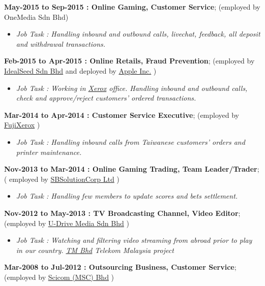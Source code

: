 \documentclass[]{article}
\providecommand{\tightlist}{%
  \setlength{\itemsep}{0pt}\setlength{\parskip}{0pt}}
\begin{document}
\textbf{May-2015 to Sep-2015 : Online Gaming, Customer Service};
(employed by OneMedia Sdn Bhd)

\begin{itemize}
\tightlist
\item
  \emph{Job Task : Handling inbound and outbound calls, livechat,
  feedback, all deposit and withdrawal transactions.}
\end{itemize}

\textbf{Feb-2015 to Apr-2015 : Online Retails, Fraud Prevention};
(employed by \href{http://www.idealseed.com/}{IdealSeed Sdn Bhd} and
deployed by \href{http://www.apple.com}{Apple Inc.} )

\begin{itemize}
\tightlist
\item
  \emph{Job Task : Working in \href{https://www.xerox.com/}{Xerox}
  office. Handling inbound and outbound calls, check and approve/reject
  customers' ordered transactions.}
\end{itemize}

\textbf{Mar-2014 to Apr-2014 : Customer Service Executive}; (employed by
\href{https://www.fujixerox.com}{FujiXerox} )

\begin{itemize}
\tightlist
\item
  \emph{Job Task : Handling inbound calls from Taiwanese customers'
  orders and printer maintenance.}
\end{itemize}

\textbf{Nov-2013 to Mar-2014 : Online Gaming Trading, Team
Leader/Trader}; ( employed by
\href{http://www.gb-links.com/}{SBSolutionCorp Ltd} )

\begin{itemize}
\tightlist
\item
  \emph{Job Task : Handling few members to update scores and bets
  settlement.}
\end{itemize}

\textbf{Nov-2012 to May-2013 : TV Broadcasting Channel, Video Editor};
(employed by \href{http://www.udrive-media.com/}{U-Drive Media Sdn Bhd}
)

\begin{itemize}
\tightlist
\item
  \emph{Job Task : Watching and filtering video streaming from abroad
  prior to play in our country. \href{https://tm.com.my/\#/explore}{TM
  Bhd} Telekom Malaysia project}
\end{itemize}

\textbf{Mar-2008 to Jul-2012 : Outsourcing Business, Customer Service};
(employed by \href{http://www.scicom-intl.com/}{Scicom (MSC) Bhd} )
\end{document}
